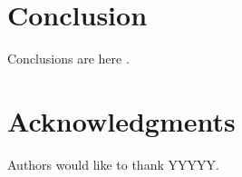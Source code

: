 \documentclass{llncs}
\begin{document}
\section{Conclusion}\label{sec:Conclusion}

Conclusions are here \cite{aksay2007camera}.

\section*{Acknowledgments}\label{sec:Acknowledgments}

Authors would like to thank YYYYY.




%	
%	
\end{document}
